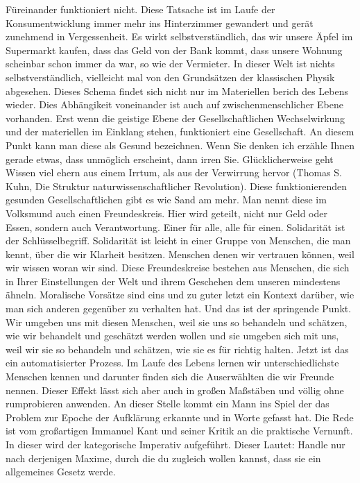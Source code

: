 Füreinander funktioniert nicht. Diese Tatsache ist im Laufe der Konsumentwicklung immer mehr ins Hinterzimmer gewandert
und gerät zunehmend in Vergessenheit. Es wirkt selbstverständlich, das wir unsere Äpfel im Supermarkt kaufen, dass
das Geld von der Bank kommt, dass unsere Wohnung scheinbar schon immer da war, so wie der Vermieter.
In dieser Welt ist nichts selbstverständlich, vielleicht mal von den Grundsätzen der klassischen Physik abgesehen.
Dieses Schema findet sich nicht nur im Materiellen berich des Lebens wieder. Dies Abhängikeit voneinander ist auch auf
zwischenmenschlicher Ebene vorhanden. Erst wenn die geistige Ebene der Gesellschaftlichen Wechselwirkung und der materiellen im
Einklang stehen, funktioniert eine Gesellschaft. An diesem Punkt kann man diese als Gesund bezeichnen. Wenn Sie denken
ich erzähle Ihnen gerade etwas, dass unmöglich erscheint, dann irren Sie. Glücklicherweise geht Wissen viel ehern aus einem
Irrtum, als aus der Verwirrung hervor (Thomas S. Kuhn, Die Struktur naturwissenschaftlicher Revolution).
Diese funktionierenden gesunden Gesellschaftlichen gibt es wie Sand am mehr.
Man nennt diese im Volksmund auch einen Freundeskreis. Hier wird geteilt, nicht nur Geld oder Essen, sondern auch Verantwortung.
Einer für alle, alle für einen. Solidarität ist der Schlüsselbegriff. Solidarität ist leicht in einer Gruppe von
Menschen, die man kennt, über die wir Klarheit besitzen. Menschen denen wir vertrauen können, weil wir wissen woran wir sind.
Diese Freundeskreise bestehen aus Menschen, die sich in Ihrer Einstellungen der Welt und ihrem Geschehen dem unseren
mindestens ähneln. Moralische Vorsätze sind eins und zu guter letzt ein Kontext darüber, wie man sich anderen gegenüber
zu verhalten hat. Und das ist der springende Punkt. Wir umgeben uns mit diesen Menschen, weil sie uns so behandeln und schätzen,
wie wir behandelt und geschätzt werden wollen und sie umgeben sich mit uns, weil wir sie so behandeln und schätzen, wie
sie es für richtig halten. Jetzt ist das ein automatisierter Prozess. Im Laufe des Lebens lernen wir unterschiedlichste 
Menschen kennen und darunter finden sich die Auserwählten die wir Freunde nennen. Dieser Effekt lässt sich aber auch
in großen Maßstäben und völlig ohne rumprobieren anwenden. An dieser Stelle kommt ein Mann ins Spiel
der das Problem zur Epoche der Aufklärung erkannte und in Worte gefasst hat. Die Rede ist vom großartigen Immanuel Kant und seiner
Kritik an die praktische Vernunft. In dieser wird der kategorische Imperativ aufgeführt. Dieser Lautet: \glqq Handle nur nach derjenigen Maxime, durch die du zugleich wollen kannst, dass sie ein allgemeines Gesetz werde. \grqq
